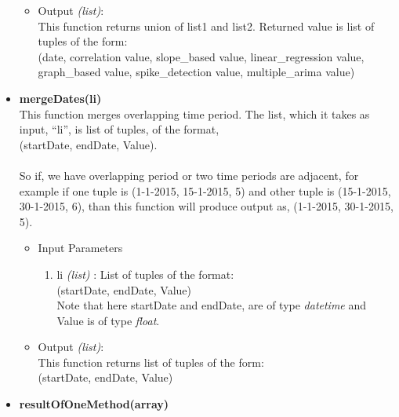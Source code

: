 \begin{itemize}
\begin{itemize}
\begin{enumerate}
 \end{enumerate}

 \item Output \textit{(list)}: \\
 This function returns union of list1 and list2. Returned value is list of 
tuples of the form: \\
 (date, correlation value, slope\_based value, linear\_regression value, 
graph\_based value, spike\_detection value, multiple\_arima value)

 \end{itemize}
 
 
 
 
  \item \textbf{mergeDates(li)} \\
  
  
  This function merges overlapping time period. The list, which it takes as 
input, ``li'', is list of tuples, of the format, \\
  (startDate, endDate, Value). \\
  \\
  So if, we have overlapping period or two time periods are adjacent, for 
example if one tuple is (1-1-2015, 15-1-2015, 5) and other tuple is (15-1-2015, 
30-1-2015, 6), than this function will produce output as, 
(1-1-2015, 30-1-2015, 5).
  
  \begin{itemize}
 \item Input Parameters
 
 \begin{enumerate}
  \item li \textit{(list)} : List of tuples of the format: \\
  (startDate, endDate, Value) \\
  Note that here startDate and endDate, are of type \textit{datetime} and Value 
is of type \textit{float}.
 \end{enumerate}

 \item Output \textit{(list)}: \\
 This function returns list of tuples of the form: \\
 (startDate, endDate, Value)

 \end{itemize}
  
  
  
  
 \item \textbf{resultOfOneMethod(array)} \\
 

\end{itemize}
